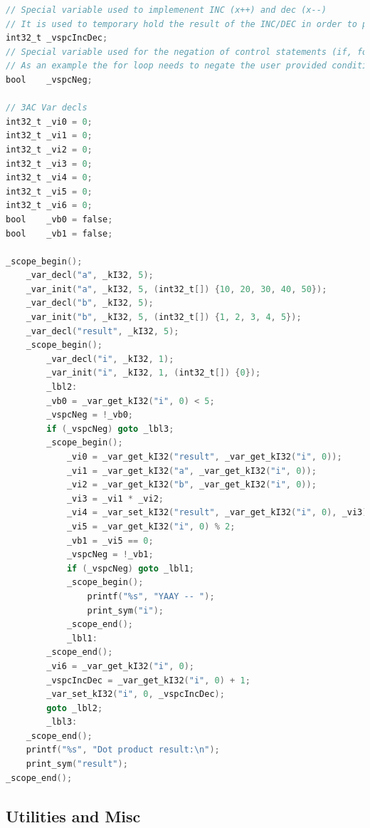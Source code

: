 \documentclass[a4paper]{article}
\begin{document}
\begin{lstlisting}[language=C]
// Special variable used to implemenent INC (x++) and dec (x--)
// It is used to temporary hold the result of the INC/DEC in order to perform the side effect
int32_t _vspcIncDec;
// Special variable used for the negation of control statements (if, for, ...)
// As an example the for loop needs to negate the user provided condition
bool    _vspcNeg;

// 3AC Var decls
int32_t _vi0 = 0;
int32_t _vi1 = 0;
int32_t _vi2 = 0;
int32_t _vi3 = 0;
int32_t _vi4 = 0;
int32_t _vi5 = 0;
int32_t _vi6 = 0;
bool    _vb0 = false;
bool    _vb1 = false;

_scope_begin();
    _var_decl("a", _kI32, 5);
    _var_init("a", _kI32, 5, (int32_t[]) {10, 20, 30, 40, 50});
    _var_decl("b", _kI32, 5);
    _var_init("b", _kI32, 5, (int32_t[]) {1, 2, 3, 4, 5});
    _var_decl("result", _kI32, 5);
    _scope_begin();
        _var_decl("i", _kI32, 1);
        _var_init("i", _kI32, 1, (int32_t[]) {0});
        _lbl2:
        _vb0 = _var_get_kI32("i", 0) < 5;
        _vspcNeg = !_vb0;
        if (_vspcNeg) goto _lbl3;
        _scope_begin();
            _vi0 = _var_get_kI32("result", _var_get_kI32("i", 0));
            _vi1 = _var_get_kI32("a", _var_get_kI32("i", 0));
            _vi2 = _var_get_kI32("b", _var_get_kI32("i", 0));
            _vi3 = _vi1 * _vi2;
            _vi4 = _var_set_kI32("result", _var_get_kI32("i", 0), _vi3);
            _vi5 = _var_get_kI32("i", 0) % 2;
            _vb1 = _vi5 == 0;
            _vspcNeg = !_vb1;
            if (_vspcNeg) goto _lbl1;
            _scope_begin();
                printf("%s", "YAAY -- ");
                print_sym("i");
            _scope_end();
            _lbl1:
        _scope_end();
        _vi6 = _var_get_kI32("i", 0);
        _vspcIncDec = _var_get_kI32("i", 0) + 1;
        _var_set_kI32("i", 0, _vspcIncDec);
        goto _lbl2;
        _lbl3:
    _scope_end();
    printf("%s", "Dot product result:\n");
    print_sym("result");
_scope_end();
\end{lstlisting}


\subsection{Utilities and Misc}
\end{document}
